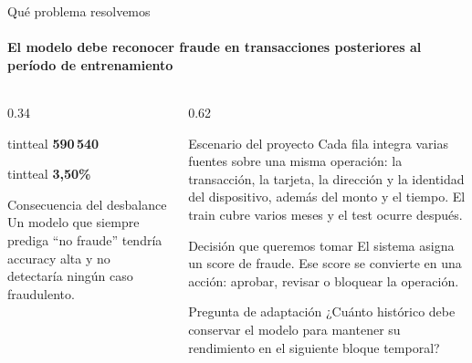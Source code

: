 \documentclass[aspectratio=169,11pt]{beamer}
\newcommand{\statcard}[3]{%
  \begin{beamercolorbox}[center,sep=0.20cm,rounded=true]{#2}%
    {\Large\bfseries #3}\par\vspace{0.02em}{\footnotesize #1}%
  \end{beamercolorbox}%
}
\begin{document}
\begin{frame}{Qué problema resolvemos}
  \framesubtitle{El modelo debe reconocer fraude en transacciones posteriores al período de entrenamiento}
  \begin{columns}[T]
    \begin{column}{0.34\textwidth}
      \statcard{transacciones de entrenamiento}{tintteal}{\color{ink}590\,540}
      \vspace{0.25em}
      \statcard{fraudes · desbalance 1:27}{tintteal}{\color{coral}3,50\%}
      \vspace{0.4em}
      \begin{alertblock}{Consecuencia del desbalance}
        \small Un modelo que siempre prediga ``no fraude'' tendría accuracy alta y no detectaría ningún caso fraudulento.
      \end{alertblock}
    \end{column}
    \begin{column}{0.62\textwidth}
      \begin{block}{Escenario del proyecto}
        \small Cada fila integra varias fuentes sobre una misma operación: la transacción, la tarjeta, la dirección y la identidad del dispositivo, además del monto y el tiempo. El train cubre varios meses y el test ocurre después.
      \end{block}
      \begin{block}{Decisión que queremos tomar}
        \small El sistema asigna un score de fraude. Ese score se convierte en una acción: aprobar, revisar o bloquear la operación.
      \end{block}
      \begin{block}{Pregunta de adaptación}
        \small ¿Cuánto histórico debe conservar el modelo para mantener su rendimiento en el siguiente bloque temporal?
      \end{block}
    \end{column}
  \end{columns}
\end{frame}
\end{document}
